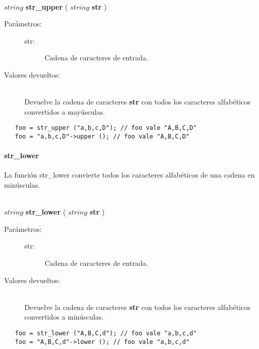 \begin{framed}
\hfill \\ $string$ \textbf{str\_upper} ( $string$ \textbf{str} )  
\begin{description}
\item [Parámetros:] \hfill 
   \begin{description}
   \item[str:] Cadena de caracteres de entrada.
   \end{description}
\item[Valores devueltos:] \hfill \\
   Devuelve la cadena de caracteres \textbf{str} con todos los caracteres alfabéticos convertidos a mayúsculas.
\end{description}
\end{framed}

\begin{lstlisting}
   foo = str_upper ("a,b,c,D"); // foo vale "A,B,C,D"
   foo = "a,b,c,D"->upper (); // foo vale "A,B,C,D" 
\end{lstlisting}

\paragraph{str\_lower}
La función str\_lower convierte todos los caracteres alfabéticos de una cadena en minúsculas. 

\begin{framed}
\hfill \\ $string$ \textbf{str\_lower} ( $string$ \textbf{str} )  
\begin{description}
\item [Parámetros:] \hfill 
   \begin{description}
   \item[str:] Cadena de caracteres de entrada.
   \end{description}
\item[Valores devueltos:] \hfill \\
   Devuelve la cadena de caracteres \textbf{str} con todos los caracteres alfabéticos convertidos a minúsculas.
\end{description}
\end{framed}

\begin{lstlisting}   
   foo = str_lower ("A,B,C,d"); // foo vale "a,b,c,d"
   foo = "A,B,C,d"->lower (); // foo vale "a,b,c,d" 
\end{lstlisting}

